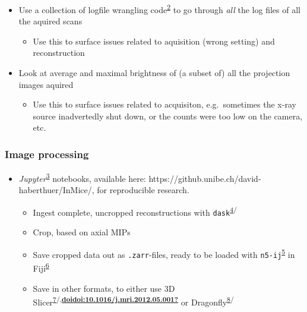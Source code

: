 \begin{itemize}
\tightlist
\item
  Use a collection of logfile wrangling code\textsuperscript{\protect\hyperlink{ref-H6XCd3xt}{2}} to go through \emph{all} the log files of all the aquired scans

  \begin{itemize}
  \tightlist
  \item
    Use this to surface issues related to aquisition (wrong setting) and reconstruction
  \end{itemize}
\item
  Look at average and maximal brightness of (a subset of) all the projection images aquired

  \begin{itemize}
  \tightlist
  \item
    Use this to surface issues related to acquisiton, e.g.~sometimes the x-ray source inadvertedly shut down, or the counts were too low on the camera, etc.
  \end{itemize}
\end{itemize}

\hypertarget{image-processing}{%
\subsubsection{Image processing}\label{image-processing}}

\begin{itemize}
\tightlist
\item
  \emph{Jupyter}\textsuperscript{\protect\hyperlink{ref-pQ6Wbz73}{3}} notebooks, available here: https://github.unibe.ch/david-haberthuer/InMice/, for reproducible research.

  \begin{itemize}
  \tightlist
  \item
    Ingest complete, uncropped reconstructions with \texttt{dask}\textsuperscript{\protect\hyperlink{ref-XiaoRBMn}{4}/}
  \item
    Crop, based on axial MIPs
  \item
    Save cropped data out as \texttt{.zarr}-files, ready to be loaded with \texttt{n5-ij}\textsuperscript{\protect\hyperlink{ref-fYJW62aO}{5}} in Fiji\textsuperscript{\protect\hyperlink{ref-Fkmz2cmo}{6}}
  \item
    Save in other formats, to either use 3D Slicer\textsuperscript{\protect\hyperlink{ref-2wCiF0bw}{7}/,\protect\hyperlink{ref-doidoi:10.1016ux2fj.mri.2012.05.001}{\textbf{doidoi:10.1016/j.mri.2012.05.001?}}} or Dragonfly\textsuperscript{\protect\hyperlink{ref-UclosTg9}{8}/}
  \end{itemize}
\end{itemize}

